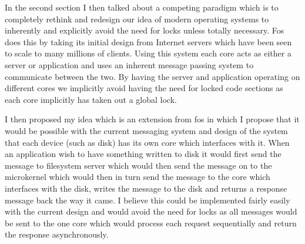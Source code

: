 \documentclass[journal]{IEEEtran}
\begin{document}
In the second section I then talked about a competing paradigm which is to completely rethink and redesign our idea of modern operating systems to inherently and explicitly avoid the need for locks unless totally necessary. Fos \cite{fos} does this by taking its initial design from Internet servers which have been seen to scale to many millions of clients. Using this system each core acts as either a server or application and uses an inherent message passing system to communicate between the two. By having the server and application operating on different cores we implicitly avoid having the need for locked code sections as each core implicitly has taken out a global lock. 

I then proposed my idea which is an extension from fos in which I propose that it would be possible with the current messaging system and design of the system that each device (such as disk) has its own core which interfaces with it. When an application wish to have something written to disk it would first send the message to filesystem server which would then send the message on to the microkernel which would then in turn send the message to the core which interfaces with the disk, writes the message to the disk and returns a response message back the way it came. I believe this could be implemented fairly easily with the current design and would avoid the need for locks as all messages would be sent to the one core which would process each request sequentially and return the response asynchronously. 




\end{document}
